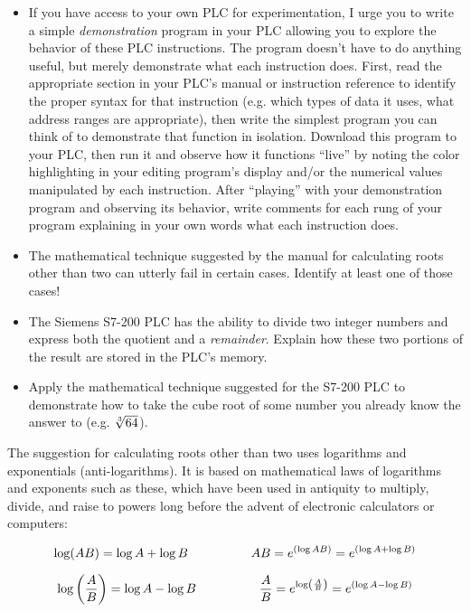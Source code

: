 \begin{itemize}
\item{} If you have access to your own PLC for experimentation, I urge you to write a simple {\it demonstration} program in your PLC allowing you to explore the behavior of these PLC instructions.  The program doesn't have to do anything useful, but merely demonstrate what each instruction does.  First, read the appropriate section in your PLC's manual or instruction reference to identify the proper syntax for that instruction (e.g. which types of data it uses, what address ranges are appropriate), then write the simplest program you can think of to demonstrate that function in isolation.  Download this program to your PLC, then run it and observe how it functions ``live'' by noting the color highlighting in your editing program's display and/or the numerical values manipulated by each instruction.  After ``playing'' with your demonstration program and observing its behavior, write comments for each rung of your program explaining in your own words what each instruction does.
\item{} The mathematical technique suggested by the manual for calculating roots other than two can utterly fail in certain cases.  Identify at least one of those cases!
\item{} The Siemens S7-200 PLC has the ability to divide two integer numbers and express both the quotient and a {\it remainder}.  Explain how these two portions of the result are stored in the PLC's memory.
\item{} Apply the mathematical technique suggested for the S7-200 PLC to demonstrate how to take the cube root of some number you already know the answer to (e.g. $\root 3 \of {64}$).
\end{itemize}







The suggestion for calculating roots other than two uses logarithms and exponentials (anti-logarithms).  It is based on mathematical laws of logarithms and exponents such as these, which have been used in antiquity to multiply, divide, and raise to powers long before the advent of electronic calculators or computers:

$$\log (AB) = \log A + \log B \hskip 50pt AB = e^{(\log AB)} = e^{(\log A + \log B)}$$

$$\log \left(A \over B \right) = \log A - \log B \hskip 50pt {A \over B} = e^{\log \left(A \over B \right)} = e^{(\log A - \log B)} $$

